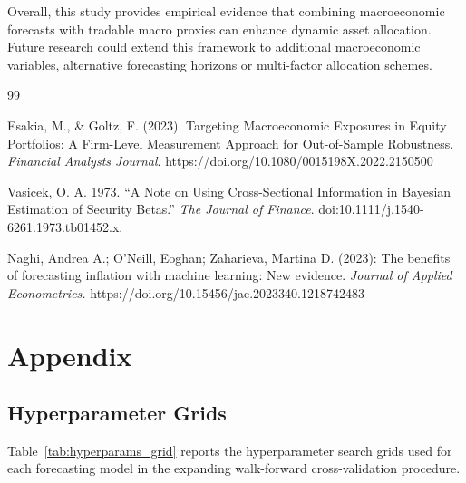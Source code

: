 \documentclass{article}
\begin{document}
Overall, this study provides empirical evidence that combining macroeconomic forecasts with tradable macro proxies can enhance dynamic asset allocation. Future research could extend this framework to additional macroeconomic variables, alternative forecasting horizons or multi-factor allocation schemes.


\begin{thebibliography}{99}

Esakia, M., \& Goltz, F. (2023). Targeting Macroeconomic Exposures in Equity Portfolios: A Firm-Level Measurement Approach for Out-of-Sample Robustness. \textit{Financial Analysts Journal}. https://doi.org/10.1080/0015198X.2022.2150500

Vasicek, O. A. 1973. “A Note on Using Cross-Sectional Information in Bayesian Estimation of Security Betas.” \textit{The Journal of Finance}.  doi:10.1111/j.1540-6261.1973.tb01452.x.

Naghi, Andrea A.; O'Neill, Eoghan; Zaharieva, Martina D. (2023): The benefits of forecasting inflation with machine learning: New evidence. \textit{Journal of Applied Econometrics.} https://doi.org/10.15456/jae.2023340.1218742483

\end{thebibliography}

\newpage

\section{Appendix}
\subsection{Hyperparameter Grids}
\label{sec:hyperparams_grid}

Table~\ref{tab:hyperparams_grid} reports the hyperparameter search grids used for each forecasting model in the expanding walk-forward cross-validation procedure.
\end{document}
